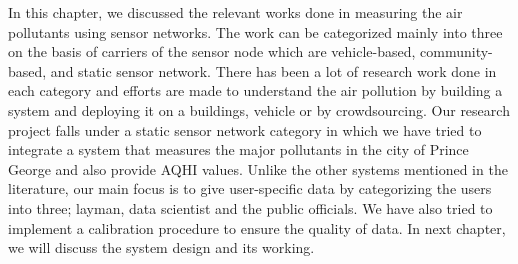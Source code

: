  In this chapter, we discussed the relevant works done in measuring the air pollutants using sensor networks. The work can be categorized mainly into three on the basis of carriers of the sensor node which are vehicle-based, community-based, and static sensor network. There has been a lot of research work done in each category and efforts are made to understand the air pollution by building a system and deploying it on a buildings, vehicle or by crowdsourcing. Our research project falls under a static sensor network category in which we have tried to integrate a system that measures the major pollutants in the city of Prince George and also provide AQHI values. Unlike the other systems mentioned in the literature, our main focus is to give  user-specific data by categorizing the users into three; layman, data scientist and the public officials. We have also tried to implement a calibration procedure to ensure the quality of data. In next chapter, we will discuss the system design and its working. 
